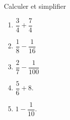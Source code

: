 
\begin{exercice}\label{exo2smath-0040}

    Calculer et simplifier
\begin{multicols}{3}
    \begin{enumerate}
        \item
            \( \dfrac{ 3 }{ 4 }+\dfrac{ 7 }{ 4 }\)
        \item
            \( \dfrac{ 1 }{ 8 }-\dfrac{ 1 }{ 16 }\)
        \item
            \( \dfrac{ 2 }{ 7 }-\dfrac{ 1 }{ 100 }\)
        \item
            \( \dfrac{ 5 }{ 6 }+8\).
        \item
            \( 1-\dfrac{1}{ 10 }\).
    \end{enumerate}
\end{multicols}


\end{exercice}

